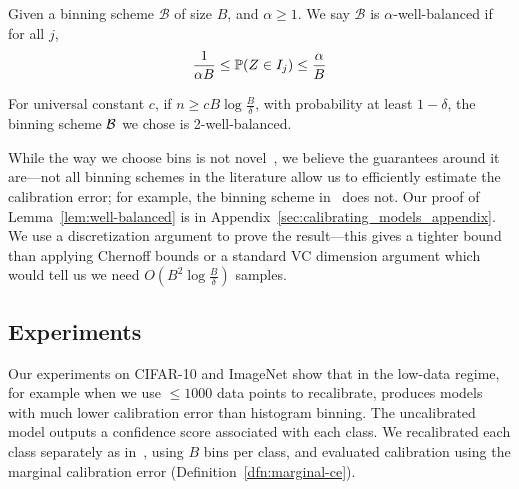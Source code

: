 \begin{definition}
Given a binning scheme $\mathcal{B}$ of size $B$, and $\alpha \geq 1$. We say $\mathcal{B}$ is $\alpha$-well-balanced if for all $j$,
  \[ \frac{1}{\alpha B} \leq \mathbb{P}(Z \in I_j) \leq \frac{\alpha}{B}\]
\end{definition}

\newcommand{\wellBalancedText}{
  For universal constant $c$, if $n \geq cB\log{\frac{B}{\delta}}$, with probability at least $1 - \delta$, the binning scheme $\bins{}$ we chose is 2-well-balanced.
}

\begin{lemma}
\label{lem:well-balanced}
\wellBalancedText{}
\end{lemma}

\newtheorem*{wellBalanced}{Restatement of Lemma~\ref{lem:well-balanced}}

While the way we choose bins is not novel~\cite{zadrozny2001calibrated}, we believe the guarantees around it are---not all binning schemes in the literature allow us to efficiently estimate the calibration error; for example, the binning scheme in~\cite{guo2017calibration} does not. Our proof of Lemma~\ref{lem:well-balanced} is in Appendix~\ref{sec:calibrating_models_appendix}. We use a discretization argument to prove the result---this gives a tighter bound than applying Chernoff bounds or a standard VC dimension argument which would tell us we need $O(B^2\log{\frac{B}{\delta}})$ samples. 

\subsection{Experiments}

Our experiments on CIFAR-10 and ImageNet show that in the low-data regime, for example when we use $\leq 1000$ data points to recalibrate, \ourcal{} produces models with much lower calibration error than histogram binning. The uncalibrated model outputs a confidence score associated with each class. We recalibrated each class separately as in~\cite{zadrozny2002transforming}, using $B$ bins per class, and evaluated calibration using the marginal calibration error (Definition~\ref{dfn:marginal-ce}).

